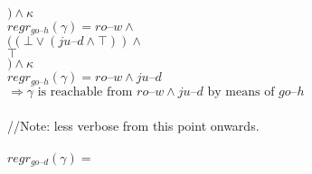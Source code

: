 \documentclass[11pt,a4paper]{article}
\newcommand{\h}[0]{\text{--}}
\begin{document}
\hphantom{aaaa}$) \land \kappa$\\
$regr_{go\h h}(\gamma)=ro\h w\land$\\
\hphantom{aaaa}$((\bot \lor (ju\h d\land \top))\land$\\
\hphantom{aaaaaa}$\top$\\
\hphantom{aaaa}$) \land \kappa$\\
$regr_{go\h h}(\gamma)=ro\h w\land ju\h d$\\
$\Rightarrow \gamma \text{ is reachable from }ro\h w\land ju\h d \text{ by means of } go\h h$\\
\\
//Note: less verbose from this point onwards.\\
\\
$regr_{go\h d}(\gamma)=$
\end{document}
